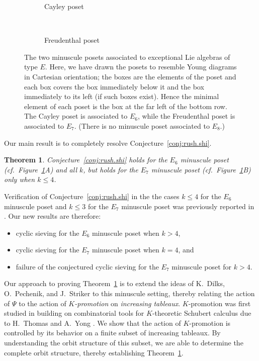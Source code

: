 \documentclass[12pt]{amsart}
\newtheorem{theorem}{Theorem}[section]
\theoremstyle{definition}
\theoremstyle{remark}
\numberwithin{equation}{section}
\begin{document}
\begin{figure}[h]
	\begin{subfigure}[b]{0.27\textwidth}
		\centering
		\caption{Cayley poset}
	\end{subfigure} \\ \vspace{4mm}
	\begin{subfigure}[b]{0.27\textwidth}
		\centering
		\caption{Freudenthal poset}
	\end{subfigure}
\caption{The two minuscule posets associated to exceptional Lie algebras of type $E$. Here, we have drawn the posets to resemble Young diagrams in Cartesian orientation; the boxes are the elements of the poset and each box covers the box immediately below it and the box immediately to its left (if such boxes exist). Hence the minimal element of each poset is the box at the far left of the bottom row.
 The Cayley poset is associated to $E_6$, while the Freudenthal poset is associated to $E_7$. (There is no minuscule poset associated to $E_8$.)}
\label{fig:min_poset_E}
\end{figure}

Our main result is to completely resolve Conjecture~\ref{conj:rush.shi}. 
\begin{theorem}\label{thm:exceptionals}
Conjecture~\ref{conj:rush.shi} holds for the $E_6$ minuscule poset (cf.~Figure~\ref{fig:min_poset_E}A) and all $k$, but holds for the $E_7$ minuscule poset (cf.~Figure~\ref{fig:min_poset_E}B) only when $k \leq 4$. 
\end{theorem}  
Verification of Conjecture~\ref{conj:rush.shi} in the the cases $k \leq 4$ for the $E_6$ minuscule poset and $k \leq 3$ for the $E_7$ minuscule poset was previously reported in \cite{Rush.Shi}. Our new results are therefore:
\begin{itemize}
\item cyclic sieving for the $E_6$ minuscule poset when $k > 4$,
\item cyclic sieving for the $E_7$ minuscule poset when $k = 4$, and
\item failure of the conjectured cyclic sieving for the $E_7$ minuscule poset for $k > 4$.
\end{itemize}

Our approach to proving Theorem~\ref{thm:exceptionals} is to extend the ideas of K.~Dilks, O.~Pechenik, and J.~Striker \cite{DPS} to this minuscule setting, thereby relating the action of $\Psi$ to the action of \emph{$K$-promotion} on \emph{increasing tableaux}. $K$-promotion was first studied in \cite{Pechenik} building on combinatorial tools for $K$-theoretic Schubert calculus due to H.~Thomas and A.~Yong \cite{Thomas.Yong:K}. We show that the action of $K$-promotion is controlled by its behavior on a finite subset of increasing tableaux. By understanding the orbit structure of this subset, we are able to determine the complete orbit structure, thereby establishing Theorem~\ref{thm:exceptionals}.
\end{document}

